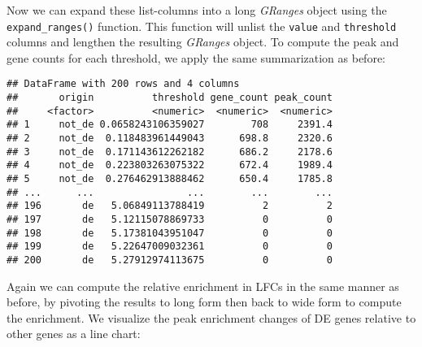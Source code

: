 \documentclass[
]{article}
\newenvironment{Shaded}{}{}
\newcommand{\DataTypeTok}[1]{\textcolor[rgb]{0.56,0.13,0.00}{#1}}
\newcommand{\DecValTok}[1]{\textcolor[rgb]{0.25,0.63,0.44}{#1}}
\newcommand{\KeywordTok}[1]{\textcolor[rgb]{0.00,0.44,0.13}{\textbf{#1}}}
\newcommand{\NormalTok}[1]{#1}
\newcommand{\OperatorTok}[1]{\textcolor[rgb]{0.40,0.40,0.40}{#1}}
\newcommand{\StringTok}[1]{\textcolor[rgb]{0.25,0.44,0.63}{#1}}
\begin{document}
Now we can expand these list-columns into a long \emph{GRanges} object using the
\texttt{expand\_ranges()} function. This function will unlist the \texttt{value} and
\texttt{threshold} columns and lengthen the resulting \emph{GRanges} object. To compute
the peak and gene counts for each threshold, we apply the same summarization as
before:

\begin{Shaded}
\end{Shaded}

\begin{verbatim}
## DataFrame with 200 rows and 4 columns
##       origin          threshold gene_count peak_count
##     <factor>          <numeric>  <numeric>  <numeric>
## 1     not_de 0.0658243106359027        708     2391.4
## 2     not_de  0.118483961449043      698.8     2320.6
## 3     not_de  0.171143612262182      686.2     2178.6
## 4     not_de  0.223803263075322      672.4     1989.4
## 5     not_de  0.276462913888462      650.4     1785.8
## ...      ...                ...        ...        ...
## 196       de   5.06849113788419          2          2
## 197       de   5.12115078869733          0          0
## 198       de   5.17381043951047          0          0
## 199       de   5.22647009032361          0          0
## 200       de   5.27912974113675          0          0
\end{verbatim}

Again we can compute the relative enrichment in LFCs in the same manner as
before, by pivoting the results to long form then back to wide form to compute
the enrichment. We visualize the peak enrichment changes of DE genes relative
to other genes as a line chart:
\end{document}
